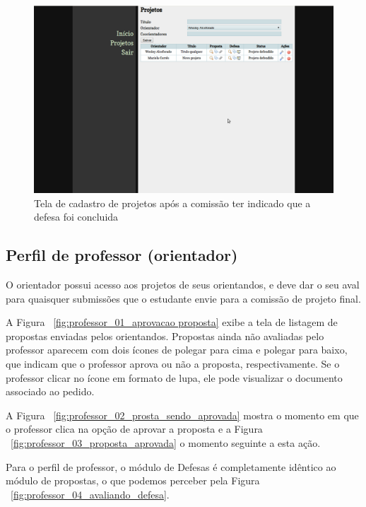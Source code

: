 \begin{figure}[htbp]
\centering
\includegraphics[width=1\textwidth]{fig/telas/processo/aluno_11_projeto_defendido.png}
\caption{Tela de cadastro de projetos após a comissão ter indicado que a defesa foi concluida}
\label{fig:aluno_11_projeto_defendido}
\end{figure}

\subsection{Perfil de professor (orientador)}
O orientador possui acesso aos projetos de seus orientandos, e deve dar o seu aval para quaisquer 
submissões que o estudante envie para a comissão de projeto final.

A Figura ~\ref{fig:professor_01_aprovacao proposta} exibe a tela de listagem de propostas
enviadas pelos orientandos. Propostas ainda não avaliadas pelo professor aparecem com dois ícones
de polegar para cima e polegar para baixo, que indicam que o professor aprova ou não a proposta, respectivamente.
Se o professor clicar no ícone em formato de lupa, ele pode visualizar o documento associado ao pedido.

A Figura ~\ref{fig:professor_02_prosta_sendo_aprovada} mostra o momento em que o professor
clica na opção de aprovar a proposta e a Figura ~\ref{fig:professor_03_proposta_aprovada} o momento
seguinte a esta ação.

Para o perfil de professor, o módulo de Defesas é completamente idêntico ao módulo de propostas, o que
podemos perceber pela Figura ~\ref{fig:professor_04_avaliando_defesa}.

